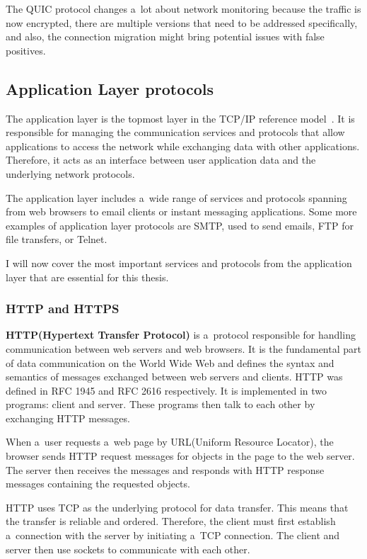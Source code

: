 \documentclass[
  printed,     %
  color,       %
  oneside,     %
  nosansbold,  %
  nocolorbold, %
  nolof,         %
  nolot,         %
]{fithesis4}
\begin{document}
\medskip

The QUIC protocol changes a~lot about network monitoring because the traffic is now encrypted, there are multiple versions that need to be addressed specifically, and also, the connection migration might bring potential issues with false positives.

\subsection{Application Layer protocols}

The application layer is the topmost layer in the TCP/IP reference model~\cite{10.5555/2584507}. It is responsible for managing the communication services and protocols that allow applications to access the network while exchanging data with other applications. Therefore, it acts as an interface between user application data and the underlying network protocols.

The application layer includes a~wide range of services and protocols spanning from web browsers to email clients or instant messaging applications. Some more examples of application layer protocols are SMTP, used to send emails, FTP for file transfers, or Telnet.

I will now cover the most important services and protocols from the application layer that are essential for this thesis.

\subsubsection{HTTP and HTTPS}

\textbf{HTTP(Hypertext Transfer Protocol)} is a~protocol responsible for handling communication between web servers and web browsers. It is the fundamental part of data communication on the World Wide Web and defines the syntax and semantics of messages exchanged between web servers and clients. HTTP was defined in RFC 1945 and RFC 2616 respectively. It is implemented in two programs: client and server. These programs then talk to each other by exchanging HTTP messages.

\medskip

When a~user requests a~web page by URL(Uniform Resource Locator), the browser sends HTTP request messages for objects in the page to the web server. The server then receives the messages and responds with HTTP response messages containing the requested objects.

HTTP uses TCP as the underlying protocol for data transfer. This means that the transfer is reliable and ordered. Therefore, the client must first establish a~connection with the server by initiating a~TCP connection. The client and server then use sockets to communicate with each other.
\end{document}

